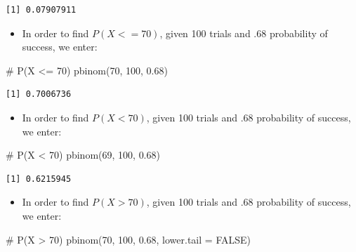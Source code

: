 \documentclass[
  letterpaper,
  DIV=11,
  numbers=noendperiod]{scrreprt}
\newenvironment{Shaded}{\begin{snugshade}}{\end{snugshade}}
\newcommand{\AttributeTok}[1]{\textcolor[rgb]{0.40,0.45,0.13}{#1}}
\newcommand{\CommentTok}[1]{\textcolor[rgb]{0.37,0.37,0.37}{#1}}
\newcommand{\ConstantTok}[1]{\textcolor[rgb]{0.56,0.35,0.01}{#1}}
\newcommand{\DecValTok}[1]{\textcolor[rgb]{0.68,0.00,0.00}{#1}}
\newcommand{\FloatTok}[1]{\textcolor[rgb]{0.68,0.00,0.00}{#1}}
\newcommand{\FunctionTok}[1]{\textcolor[rgb]{0.28,0.35,0.67}{#1}}
\newcommand{\NormalTok}[1]{\textcolor[rgb]{0.00,0.23,0.31}{#1}}
\providecommand{\tightlist}{%
  \setlength{\itemsep}{0pt}\setlength{\parskip}{0pt}}\usepackage{longtable,booktabs,array}
\begin{document}
\begin{verbatim}
[1] 0.07907911
\end{verbatim}

\begin{itemize}
\tightlist
\item
  In order to find \(P(X <= 70)\), given 100 trials and .68 probability
  of success, we enter:
\end{itemize}

\begin{Shaded}
\begin{Highlighting}[]
\CommentTok{\# P(X \textless{}= 70)}
\FunctionTok{pbinom}\NormalTok{(}\DecValTok{70}\NormalTok{, }\DecValTok{100}\NormalTok{, }\FloatTok{0.68}\NormalTok{)}
\end{Highlighting}
\end{Shaded}

\begin{verbatim}
[1] 0.7006736
\end{verbatim}

\begin{itemize}
\tightlist
\item
  In order to find \(P(X < 70)\), given 100 trials and .68 probability
  of success, we enter:
\end{itemize}

\begin{Shaded}
\begin{Highlighting}[]
\CommentTok{\# P(X \textless{} 70)}
\FunctionTok{pbinom}\NormalTok{(}\DecValTok{69}\NormalTok{, }\DecValTok{100}\NormalTok{, }\FloatTok{0.68}\NormalTok{)}
\end{Highlighting}
\end{Shaded}

\begin{verbatim}
[1] 0.6215945
\end{verbatim}

\begin{itemize}
\tightlist
\item
  In order to find \(P(X > 70)\), given 100 trials and .68 probability
  of success, we enter:
\end{itemize}

\begin{Shaded}
\begin{Highlighting}[]
\CommentTok{\# P(X \textgreater{} 70)}
\FunctionTok{pbinom}\NormalTok{(}\DecValTok{70}\NormalTok{, }\DecValTok{100}\NormalTok{, }\FloatTok{0.68}\NormalTok{, }\AttributeTok{lower.tail =} \ConstantTok{FALSE}\NormalTok{)}
\end{Highlighting}
\end{Shaded}
\end{document}

